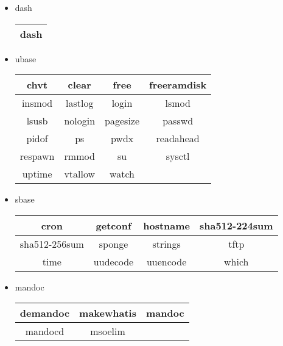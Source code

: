 \begin{itemize}
    \item dash
        \begin{center}
            \begin{tabular}{|c|}
                \hline
                dash \\
                \hline
            \end{tabular}
        \end{center}
    \item ubase
        \begin{center}
            \begin{tabular}{|c|c|c|c|}
                \hline
                chvt & clear & free & freeramdisk  \\
                \hline
                insmod & lastlog & login & lsmod  \\
                \hline
                lsusb & nologin & pagesize & passwd  \\
                \hline
                pidof & ps & pwdx & readahead  \\
                \hline
                respawn & rmmod & su & sysctl  \\
                \hline
                uptime & vtallow & watch \\
                \cline{1-3}
            \end{tabular}
        \end{center}
    \item sbase
        \begin{center}
            \begin{tabular}{|c|c|c|c|}
                \hline
                cron & getconf & hostname & sha512-224sum \\
                \hline
                sha512-256sum & sponge & strings & tftp \\
                \hline
                time & uudecode & uuencode & which \\
                \hline
            \end{tabular}
        \end{center}
    \item mandoc
        \begin{center}
            \begin{tabular}{|c|c|c|}
                \hline
                demandoc & makewhatis & mandoc \\
                \hline
                mandocd & msoelim \\
                \cline{1-2}
            \end{tabular}
        \end{center}
\end{itemize}

